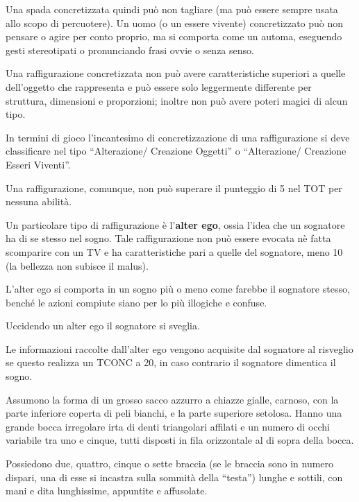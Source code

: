 Una spada concretizzata quindi pu\`o non tagliare (ma pu\`o essere
sempre usata allo scopo di percuotere).  Un uomo (o un essere vivente)
concretizzato pu\`o non pensare o agire per conto proprio, ma
si comporta come un automa, eseguendo gesti stereotipati o
pronunciando frasi ovvie o senza senso.

Una raffigurazione concretizzata non pu\`o avere caratteristiche
superiori a quelle dell'oggetto che rappresenta e pu\`o essere solo
leggermente differente per struttura, dimensioni e proporzioni;
inoltre non pu\`o avere poteri magici di alcun tipo. 

In termini di gioco l'incantesimo di concretizzazione di una
raffigurazione si deve classificare nel tipo ``Alterazione/ Creazione
Oggetti'' o ``Alterazione/ Creazione Esseri Viventi''.

Una raffigurazione, comunque, non pu\`o superare il punteggio di 5
nel TOT per nessuna abilit\`a. 

Un particolare tipo di raffigurazione \`e l'\textbf{alter ego}, ossia
l'idea che un sognatore ha di se stesso nel sogno. Tale raffigurazione
non pu\`o essere evocata n\`e fatta scomparire con un TV e ha
caratteristiche pari a quelle del sognatore, meno 10 (la bellezza non
subisce il malus).

L'alter ego si comporta in un sogno pi\`u o meno come farebbe il
sognatore stesso, bench\'e le azioni compiute siano per lo pi\`u
illogiche e confuse. 

Uccidendo un alter ego il sognatore si sveglia.

Le informazioni raccolte dall'alter ego vengono acquisite dal
sognatore al risveglio se questo realizza un TCONC a 20, in caso
contrario il sognatore dimentica il sogno. 


Assumono la forma di un grosso sacco azzurro a chiazze gialle,
carnoso, con la parte inferiore coperta di peli bianchi, e la parte
superiore setolosa. Hanno una grande bocca irregolare irta di denti
triangolari affilati e un numero di occhi variabile tra uno e cinque,
tutti disposti in fila orizzontale al di sopra della bocca.

Possiedono due, quattro, cinque o sette braccia (se le braccia sono in
numero dispari, una di esse si incastra sulla sommit\`a della
``testa'') lunghe e sottili, con mani e dita lunghissime, appuntite e
affusolate.


